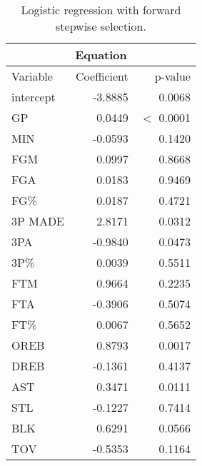 \begin{table}[h]
	\centering
	\begin{tabular}{|| l | r | r ||} 
		\hline
		\multicolumn{3}{|c|}{Equation} \\
		\hline
		Variable & Coefficient & p-value \\
		\hline
		intercept & -3.8885 & 0.0068 \\
		GP & 0.0449 & $<$ 0.0001 \\
		MIN & -0.0593 & 0.1420 \\
		FGM & 0.0997 & 0.8668 \\
		FGA & 0.0183 & 0.9469 \\
		FG\% & 0.0187 & 0.4721 \\
		3P MADE & 2.8171 & 0.0312 \\
		3PA & -0.9840 & 0.0473 \\
		3P\% & 0.0039 & 0.5511 \\
		FTM & 0.9664 & 0.2235 \\
		FTA & -0.3906 & 0.5074 \\
		FT\% & 0.0067 & 0.5652 \\
		OREB & 0.8793 & 0.0017 \\
		DREB & -0.1361 & 0.4137 \\
		AST & 0.3471 & 0.0111 \\
		STL & -0.1227 & 0.7414 \\
		BLK & 0.6291 & 0.0566 \\				
		TOV & -0.5353 & 0.1164 \\		
		\hline
	\end{tabular}
	\caption{Logistic regression with forward stepwise selection.}
	\label{table:LRFSSSum}
\end{table}